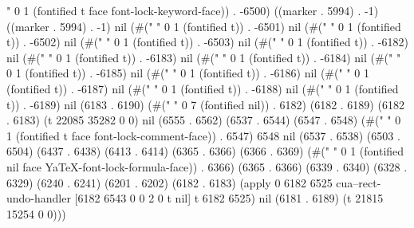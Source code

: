 " 0 1 (fontified t face font-lock-keyword-face)) . -6500) ((marker . 5994) . -1) ((marker . 5994) . -1) nil (#("	" 0 1 (fontified t)) . -6501) nil (#(" " 0 1 (fontified t)) . -6502) nil (#(" " 0 1 (fontified t)) . -6503) nil (#("%
" 0 1 (fontified t)) . -6182) nil (#(" " 0 1 (fontified t)) . -6183) nil (#(" " 0 1 (fontified t)) . -6184) nil (#(" " 0 1 (fontified t)) . -6185) nil (#(" " 0 1 (fontified t)) . -6186) nil (#(" " 0 1 (fontified t)) . -6187) nil (#(" " 0 1 (fontified t)) . -6188) nil (#(" " 0 1 (fontified t)) . -6189) nil (6183 . 6190) (#("       " 0 7 (fontified nil)) . 6182) (6182 . 6189) (6182 . 6183) (t 22085 35282 0 0) nil (6555 . 6562) (6537 . 6544) (6547 . 6548) (#(" " 0 1 (fontified t face font-lock-comment-face)) . 6547) 6548 nil (6537 . 6538) (6503 . 6504) (6437 . 6438) (6413 . 6414) (6365 . 6366) (6366 . 6369) (#("	" 0 1 (fontified nil face YaTeX-font-lock-formula-face)) . 6366) (6365 . 6366) (6339 . 6340) (6328 . 6329) (6240 . 6241) (6201 . 6202) (6182 . 6183) (apply 0 6182 6525 cua--rect-undo-handler [6182 6543 0 0 2 0 t nil] t 6182 6525) nil (6181 . 6189) (t 21815 15254 0 0)))
